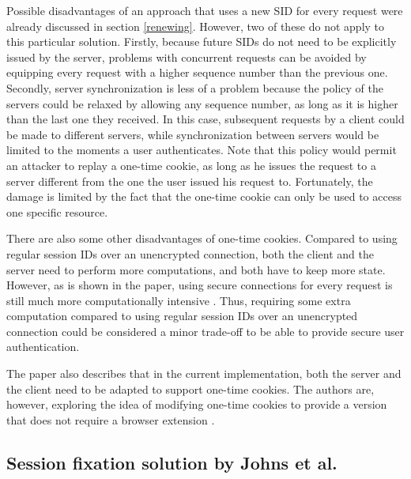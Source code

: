 Possible disadvantages of an approach that uses a new SID for every request were already discussed in section \ref{renewing}. However, two of these do not apply to this particular solution. Firstly, because future SIDs do not need to be explicitly issued by the server, problems with concurrent requests can be avoided by equipping every request with a higher sequence number than the previous one. Secondly, server synchronization is less of a problem because the policy of the servers could be relaxed by allowing any sequence number, as long as it is higher than the last one they received. In this case, subsequent requests by a client could be made to different servers, while synchronization between servers would be limited to the moments a user authenticates. Note that this policy would permit an attacker to replay a one-time cookie, as long as he issues the request to a server different from the one the user issued his request to. Fortunately, the damage is limited by the fact that the one-time cookie can only be used to access one specific resource.

There are also some other disadvantages of one-time cookies. Compared to using regular session IDs over an unencrypted connection, both the client and the server need to perform more computations, and both have to keep more state. However, as is shown in the paper, using secure connections for every request is still much more computationally intensive \cite{Dacosta2011}. Thus, requiring some extra computation compared to using regular session IDs over an unencrypted connection could be considered a minor trade-off to be able to provide secure user authentication.

The paper also describes that in the current implementation, both the server and the client need to be adapted to support one-time cookies. The authors are, however, exploring the idea of modifying one-time cookies to provide a version that does not require a browser extension \cite{Dacosta2011}.

\subsection{Session fixation solution by Johns et al.}

